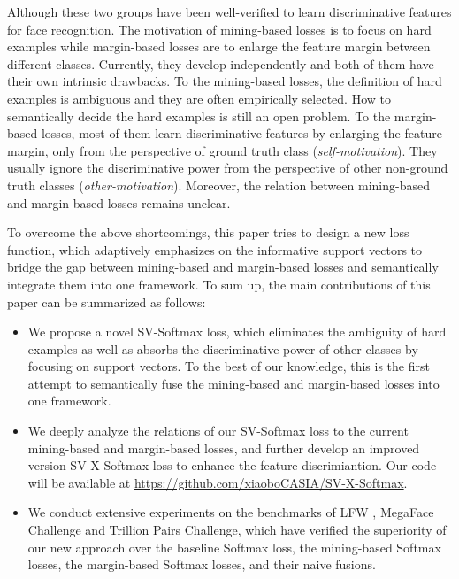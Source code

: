 \documentclass[10pt,twocolumn,letterpaper]{article}
\begin{document}
Although these two groups have been well-verified to learn discriminative features for face recognition. The motivation of mining-based losses is to focus on hard examples while margin-based losses are to enlarge the feature margin between different classes. Currently, they develop independently and both of them have their own intrinsic drawbacks. To the mining-based losses, the definition of hard examples is ambiguous and they are often empirically selected. How to semantically decide the hard examples is still an open problem. To the margin-based losses, most of them learn discriminative features by enlarging the feature margin, only from the perspective of ground truth class (\textit{self-motivation}). They usually ignore the discriminative power from the perspective of other non-ground truth classes (\textit{other-motivation}). Moreover, the relation between mining-based and margin-based losses remains unclear.

To overcome the above shortcomings, this paper tries to design a new loss function, which adaptively emphasizes on the informative support vectors to bridge the gap between mining-based and margin-based losses and semantically integrate them into one framework. To sum up, the main contributions of this paper can be summarized as follows:
\begin{itemize}
\item{We propose a novel SV-Softmax loss, which eliminates the ambiguity of hard examples as well as absorbs the discriminative power of other classes by focusing on support vectors. To the best of our knowledge, this is the first attempt to semantically fuse the mining-based and margin-based losses into one framework.}
\item{We deeply analyze the relations of our SV-Softmax loss to the current mining-based and margin-based losses, and further develop an
improved version SV-X-Softmax loss to enhance the feature discrimiantion. Our code will be available at {\url{https://github.com/xiaoboCASIA/SV-X-Softmax}}.}
\item{We conduct extensive experiments on the benchmarks of LFW \cite{LFW}, MegaFace Challenge \cite{megaface_1,megaface_2} and Trillion Pairs Challenge, which have verified the superiority of our new approach over the baseline Softmax loss, the mining-based Softmax losses, the margin-based Softmax losses, and their naive fusions.}
\end{itemize}
\end{document}
